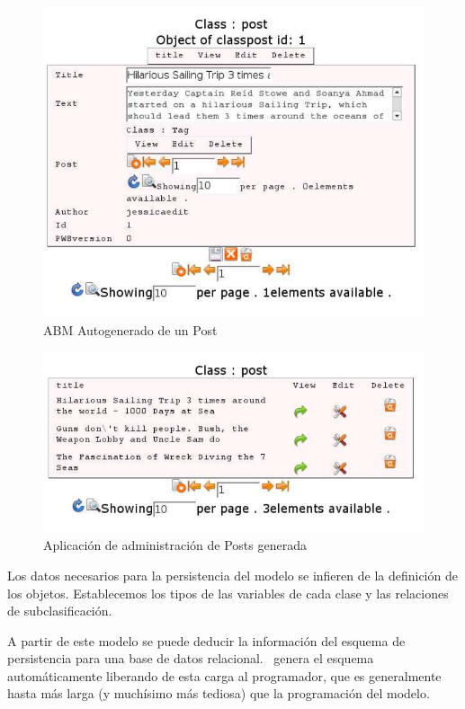 \begin{figure}
	\centering
	\includegraphics[scale=0.5]{images/abm1.pdf}
 	\caption{ABM Autogenerado de un Post}
 	\label{fig-abm1}
\end{figure}

\begin{figure}
	\centering
	\includegraphics[scale=0.5]{images/abm2.pdf}
 	\caption{Aplicación de administración de Posts generada}
 	\label{fig-abm2}
\end{figure}

Los datos necesarios para la persistencia del modelo se infieren de la definición de los objetos. Establecemos los tipos de las variables de cada clase y las relaciones de subclasificación.

A partir de este modelo se puede deducir la información del esquema de persistencia para una base de datos relacional. \PWB \ genera el esquema automáticamente liberando de esta carga al programador, que es generalmente hasta más larga (y muchísimo más tediosa) que la programación del modelo.

